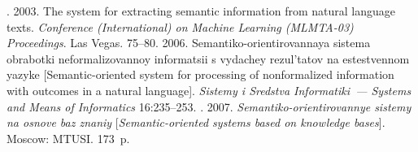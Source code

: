   \begin{multicols}{2}

\renewcommand{\bibname}{\protect\rmfamily References}

{\small\frenchspacing
{%
\begin{thebibliography}{99}


      . 2003. The system for extracting semantic information 
from natural language texts.  \textit{Conference (International) on Machine Learning (MLMTA-03) 
Proceedings}. Las Vegas. 75--80.
       2006. Semantiko-orientirovannaya sistema obrabotki neformalizovannoy 
informatsii s vydachey rezul'tatov na estestvennom yazyke [Semantic-oriented system for processing of 
nonformalized information with outcomes in a natural language]. \textit{Sistemy i
Sredstva Informatiki~---
Systems and Means of  Informatics}  16:235--253.
. 2007. \textit{Semantiko-orientirovannye sistemy na 
osnove baz znaniy} [\textit{Semantic-oriented systems based on knowledge bases}]. Moscow: MTUSI. 
173~p.



\end{thebibliography}}}
\end{multicols}
